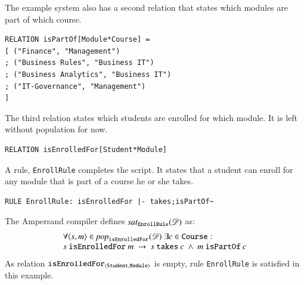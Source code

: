 \documentclass{elsarticle}
\begin{document}
   The example system also has a second relation that states which modules are part of which course.
\begin{verbatim}
RELATION isPartOf[Module*Course] =
[ ("Finance", "Management")
; ("Business Rules", "Business IT")
; ("Business Analytics", "Business IT")
; ("IT-Governance", "Management")
]
\end{verbatim}
   The third relation states which students are enrolled for which module.
   It is left without population for now.
\begin{verbatim}
RELATION isEnrolledFor[Student*Module]
\end{verbatim}

   A rule, {\tt EnrollRule} completes the script.
   It states that a student can enroll for any module that is part of a course he or she takes.
\begin{verbatim}
RULE EnrollRule: isEnrolledFor |- takes;isPartOf~
\end{verbatim}
   The Ampersand compiler defines $\text{\it sat\/}_{\tt EnrollRule}(\mathscr{D})$ as:
\begin{equation}
   \begin{array}{l}
   \forall \pair{s}{m}\in\pop{\tt isEnrolledFor}{\dataset}\ \exists c\in\text{\tt Course}:\\
   s\ \text{\tt isEnrolledFor}\ m\ \rightarrow\ s\ \text{\tt takes}\ c\ \wedge\ m\ \text{\tt isPartOf}\ c
   \end{array}
\label{eqn:example isEnrolledFor}
\end{equation}
   As relation $\text{\it \tt isEnrolledFor\/}_{\langle{\tt Student},{\tt Module}\rangle}$ is empty, rule {\tt EnrollRule} is satisfied in this example.
\end{document}

